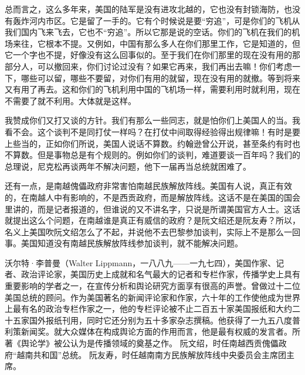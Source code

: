 总而言之，这么多年来，美国的陆军是没有进攻北越的，它也没有封锁海防，也没有轰炸河内市区。它是留了一手的。它有个时候说是要“穷追”，可是你们的飞机从我们国内飞来飞去，它也不“穷追”。所以它那是说的空话。你们的飞机在我们的机场来往，它根本不提。又例如，中国有那么多人在你们那里工作，它是知道的，但它一个字也不提，好像没有这么回事似的。至于我们在你们那里的现在没有用的那部分人，可以撤回来，你们讨论过没有？如果它再来，我们再出去嘛！你们考虑一下，哪些可以留，哪些不要留，对你们有用的就留，现在没有用的就撤。等到将来又有用了再去。这和你们的飞机利用中国的飞机场一样，需要利用时就利用，现在不需要了就不利用。大体就是这样。

我赞成你们又打又谈的方针。我们有那么一些同志，就是怕你们上美国人的当。我看不会。这个谈判不是同打仗一样吗？在打仗中间取得经验得出规律嘛！有时是要上些当的，正如你们所说，美国人说话不算数。约翰逊曾公开说，甚至条约有时也不算数。但是事物总是有个规则的。例如你们的谈判，难道要谈一百年吗？我们的总理说，尼克松再谈两年不解决问题，他下一届再当总统就困难了。

还有一点，是南越傀儡政府非常害怕南越民族解放阵线。美国有人说，真正有效的，在南越人中有影响的，不是西贡政府，而是解放阵线。这话不是在美国的国会里讲的，而是记者报道的，但谁说的又不讲名字，只说是所谓美国官方人士。这话就提出这么个问题，在南越谁是真正有威信的政府？是阮文绍还是阮友寿？所以，名义上美国吹阮文绍怎么了不起，并说他不去巴黎参加谈判，实际上不是那么一回事。美国知道没有南越民族解放阵线参加谈判，就不能解决问题。

\begin{maonote}
沃尔特·李普曼（Walter Lippmann，一八八九——一九七四），美国作家、记者、政治评论家，美国历史上成就和名气最大的记者和专栏作家，传播学史上具有重要影响的学者之一，在宣传分析和舆论研究方面享有很高的声誉。曾做过十二位美国总统的顾问。作为美国著名的新闻评论家和作家，六十年的工作使他成为世界上最有名的政治专栏作家之一，他的专栏评论被不止二百五十家美国报纸和大约二十五家国外报纸刊用，同时它还分别为五十多家杂志撰稿。他获得了一九五八度普利策新闻奖。就大众媒体在构成舆论方面的作用而言，他是最有权威的发言者。所著《舆论学》被公认为是传播领域的奠基之作。
阮文绍，时任南越西贡傀儡政府“越南共和国”总统。
阮友寿，时任越南南方民族解放阵线中央委员会主席团主席。
\end{maonote}
